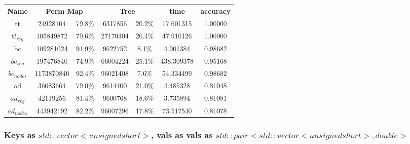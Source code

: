 \documentclass[]{article}
\begin{document}
\begin{center}
\begin{tabular} { |c|c|c|c|c|c|c| }
\hline
Name & \multicolumn{2}{c|}{Perm Map} & \multicolumn{2}{c|}{Tree} & time & accuracy \\
\hline
tt & 24928104 & 79.8\%  & 6317856 & 20.2\% & 17.601315 & 1.00000 \\

$tt_{reg}$ & 105849872 & 79.6\% & 27170304 & 20.4\% & 47.910126 & 1.00000 \\

bc &109281024 & 91.9\% & 9622752 & 8.1\% & 4.901384 & 0.98682 \\

$bc_{reg}$ & 197476840 & 74.9\% & 66004224 & 25.1\% & 438.309378 & 0.95168 \\

$bc_{nodes}$ & 1173870840 & 92.4\% & 96021408 & 7.6\% & 54.334499 & 0.98682 \\

ad & 36083664 & 79.0\% & 9614400 & 21.0\% & 4.485328 & 0.81048 \\

$ad_{reg}$ & 42119256 & 81.4\% & 9600768 & 18.6\% & 3.735894 & 0.81081 \\

$ad_{nodes}$ & 443942192 & 82.2\% & 96007296 & 17.8\% & 73.517540 & 0.81078 \\
\hline
\end{tabular}
\end{center}

\subsubsection{Keys as $std::vector<unsigned short>$, vals as vals as $std::pair<std::vector<unsigned short>, double>$}
\end{document}
